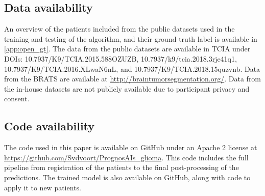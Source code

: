 \subsection{Data availability}
An overview of the patients included from the public datasets used in the training and testing of the algorithm, and their ground truth label is available in \cref{app:open_gt}.
The data from the public datasets are available in TCIA under DOIs: 10.7937/K9/TCIA.2015.588OZUZB, 10.7937/k9/tcia.2018.3rje41q1, \\10.7937/K9/TCIA.2016.XLwaN6nL, and 10.7937/K9/TCIA.2018.15quzvnb.
Data from the \gls{BRATS} are available at \url{http://braintumorsegmentation.org/}.
Data from the in-house datasets are not publicly available due to participant privacy and consent.

\subsection{Code availability}
The code used in this paper is available on GitHub under an Apache 2 license at \url{https://github.com/Svdvoort/PrognosAIs_glioma}.
This code includes the full pipeline from registration of the patients to the final post-processing of the predictions.
The trained model is also available on GitHub, along with code to apply it to new patients.


